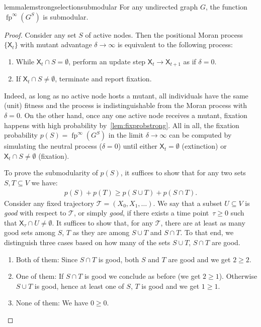 \documentclass[letterpaper]{article}
\newcommand{\X}{\mathsf{X}}
\newcommand{\fp}{\operatorname{fp}}
\newcommand{\Traj}{\mathcal{T}}
\newcommand{\FitAdv}{\delta}
\begin{document}
\begin{restatable}[Submodularity]{lemma}{lemstrongselectionsubmodular}
\label{lem:strong_selection_submodular}
For any undirected graph $G$, the function $\fp^\infty(G^S)$ is submodular.
\end{restatable}
\begin{proof}
Consider any set $S$ of active nodes.
Then the positional Moran process $\{\X_t\}$ with mutant advantage $\FitAdv\to\infty$ is equivalent to the following process:
\begin{enumerate}
\item While $\X_t\cap S=\emptyset$, perform an update step $\X_t\to\X_{t+1}$ as if $\FitAdv=0$.
\item If $\X_t\cap S\ne \emptyset$, terminate and report fixation.
\end{enumerate}
Indeed, as long as no active node hosts a mutant, all individuals have the same (unit) fitness and
the process is indistinguishable from the Moran process with $\FitAdv=0$.
On the other hand, once any one active node receives a mutant, fixation happens with high probability by~\cref{lem:fixprobstrong}.
All in all, the fixation probability $p(S)=\fp^{\infty}(G^S)$ in the limit $\FitAdv\to\infty$
can be computed by simulating the neutral process ($\FitAdv=0$) until
either $\X_t=\emptyset$ (extinction) or $\X_t\cap S\ne\emptyset$ (fixation).

To prove the submodularity of $p(S)$, it suffices to show that for any two sets $S,T\subseteq V$ we have:
\begin{align}
p(S)+p(T)\ge p(S\cup T) + p(S\cap T).
\end{align}
Consider any fixed trajectory $\Traj = (X_0,X_1,\dots)$.
We say that a subset $U\subseteq V$ is \emph{good} with respect to $\Traj$, or simply \emph{good}, if there exists a time point~$\tau\ge 0$ such that $\X_{\tau}\cap U\ne\emptyset$. It suffices to show that, for any $\Traj$, there are at least as many good sets among $S$, $T$ as they are among $S\cup T$ and $S\cap T$. To that end, we distinguish three cases based on how many of the sets $S\cup T$, $S\cap T$ are good.
\begin{enumerate}
\item Both of them: Since $S\cap T$ is good, both $S$ and $T$ are good and we get $2\ge 2$.
\item One of them: If $S\cap T$ is good we conclude as before (we get $2\ge 1$).
Otherwise $S\cup T$ is good, hence at least one of $S$, $T$ is good and we get $1\ge 1$.
\item None of them: We have $0\ge 0$. \qedhere
\end{enumerate}
\end{proof}
\end{document}
